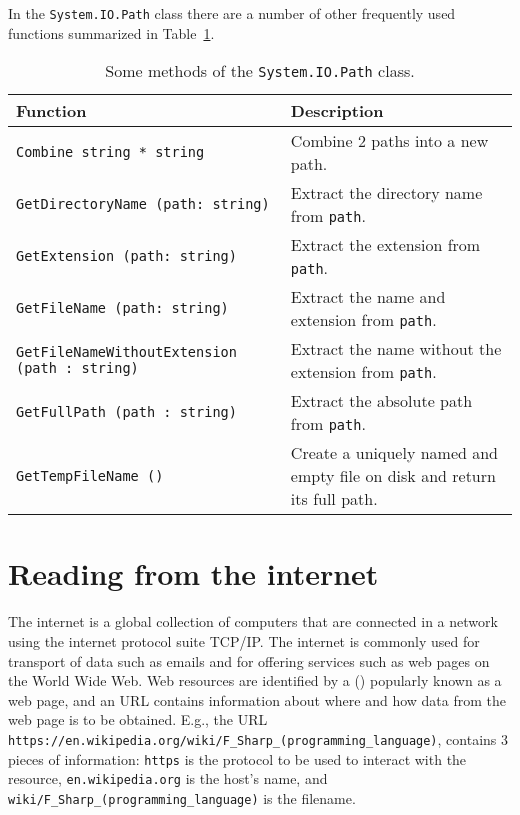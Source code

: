 In the \lstinline!System.IO.Path! class there are a number of other frequently used functions summarized in Table~\ref{tab:path}.
\begin{table}
  \begin{center}
    \begin{tabularx}{\linewidth}{|l|X|}
      \hline
      \rowcolor{headerRowColor}  Function & Description\\
      \hline
      \lstinline{Combine string * string} & Combine 2 paths into a new path.\\
      \hline
      \lstinline{GetDirectoryName (path: string)} & Extract the directory name from \lstinline{path}.\\
      \hline
      \lstinline{GetExtension (path: string)} & Extract the extension from \lstinline{path}.\\
      \hline
      \lstinline{GetFileName (path: string)} & Extract the name and extension from \lstinline{path}.\\
      \hline
      \lstinline{GetFileNameWithoutExtension (path : string)} & Extract the name without the extension from \lstinline{path}.\\
      \hline
      \lstinline{GetFullPath (path : string)} & Extract the absolute path from \lstinline{path}.\\
      \hline
      \lstinline{GetTempFileName ()} & Create a uniquely named and empty file on disk and return its full path.\\
      \hline
    \end{tabularx}
  \end{center}
  \caption{Some methods of the \lstinline!System.IO.Path! class.}
  \label{tab:path}
\end{table}

\section{Reading from the internet}
The internet is a global collection of computers that are connected in a network using the internet protocol suite TCP/IP. The internet is commonly used for transport of data such as emails and for offering services such as web pages on the World Wide Web. Web resources are identified by 
a  () popularly known as a web page, and an URL contains information about where and how data from the web page is to be obtained. E.g., the URL \lstinline[language=console]!https://en.wikipedia.org/wiki/F_Sharp_(programming_language)!, contains 3 pieces of information: \lstinline[language=console]!https! is the protocol to be used to interact with the resource, \lstinline[language=console]!en.wikipedia.org! is the host's name, and \lstinline[language=console]!wiki/F_Sharp_(programming_language)! is the filename.

